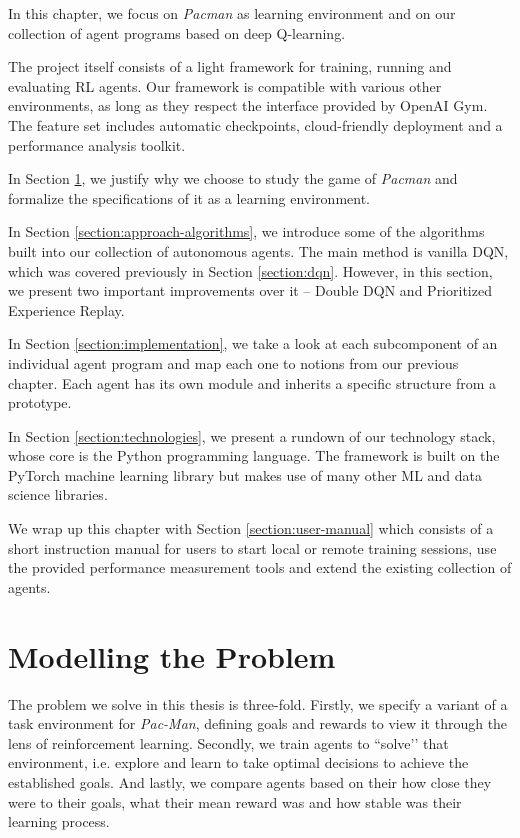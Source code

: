 In this chapter, we focus on \emph{Pacman} as learning environment and on our collection of agent programs based on deep Q-learning.

The project itself consists of a light framework for training, running and evaluating RL agents.
Our framework is compatible with various other environments, as long as they respect the interface provided by OpenAI Gym.
The feature set includes automatic checkpoints, cloud-friendly deployment and a performance analysis toolkit.

In Section \ref{section:modelling-the-problem}, we justify why we choose to study the game of \emph{Pacman} and formalize the specifications of it as a learning environment.

In Section \ref{section:approach-algorithms}, we introduce some of the algorithms built into our collection of autonomous agents.
The main method is vanilla DQN, which was covered previously in Section \ref{section:dqn}.
However, in this section, we present two important improvements over it -- Double DQN and Prioritized Experience Replay.

In Section \ref{section:implementation}, we take a look at each subcomponent of an individual agent program and map each one to notions from our previous chapter.
Each agent has its own module and inherits a specific structure from a prototype.

In Section \ref{section:technologies}, we present a rundown of our technology stack, whose core is the Python programming language. The framework is built on the PyTorch machine learning library but makes use of many other ML and data science libraries.

We wrap up this chapter with Section \ref{section:user-manual} which consists of a short instruction manual for users to start local or remote training sessions, use the provided performance measurement tools and extend the existing collection of agents.

\clearpage

\section{Modelling the Problem} \label{section:modelling-the-problem}
The problem we solve in this thesis is three-fold.
Firstly, we specify a variant of a task environment for \emph{Pac-Man}, defining goals and rewards to view it through the lens of reinforcement learning.
Secondly, we train agents to ``solve’’ that environment, i.e. explore and learn to take optimal decisions to achieve the established goals.
And lastly, we compare agents based on their how close they were to their goals, what their mean reward was and how stable was their learning process.

